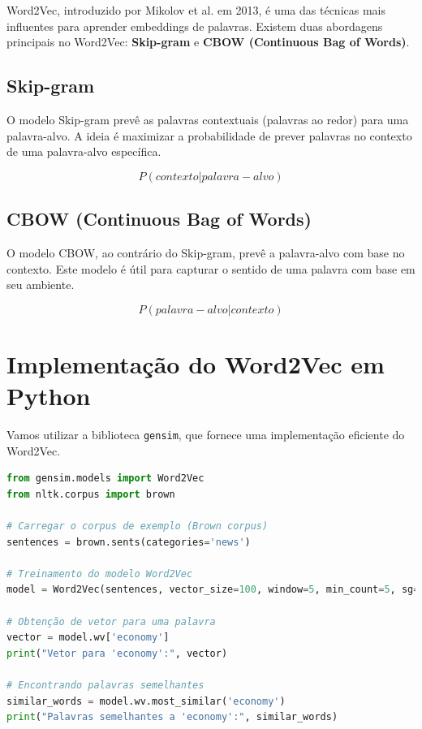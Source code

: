 \documentclass[14pt,a4paper,oneside]{book}
\begin{document}
Word2Vec, introduzido por Mikolov et al. em 2013, é uma das técnicas mais influentes para aprender embeddings de palavras. Existem duas abordagens principais no Word2Vec: \textbf{Skip-gram} e \textbf{CBOW (Continuous Bag of Words)}.

\subsection{Skip-gram}
O modelo Skip-gram prevê as palavras contextuais (palavras ao redor) para uma palavra-alvo. A ideia é maximizar a probabilidade de prever palavras no contexto de uma palavra-alvo específica.

\begin{equation}
	P(contexto | palavra-alvo)
\end{equation}

\subsection{CBOW (Continuous Bag of Words)}
O modelo CBOW, ao contrário do Skip-gram, prevê a palavra-alvo com base no contexto. Este modelo é útil para capturar o sentido de uma palavra com base em seu ambiente.

\begin{equation}
	P(palavra-alvo | contexto)
\end{equation}

\section{Implementação do Word2Vec em Python}

Vamos utilizar a biblioteca \texttt{gensim}, que fornece uma implementação eficiente do Word2Vec.

\begin{lstlisting}[language=Python]
from gensim.models import Word2Vec
from nltk.corpus import brown

# Carregar o corpus de exemplo (Brown corpus)
sentences = brown.sents(categories='news')

# Treinamento do modelo Word2Vec
model = Word2Vec(sentences, vector_size=100, window=5, min_count=5, sg=0)

# Obtenção de vetor para uma palavra
vector = model.wv['economy']
print("Vetor para 'economy':", vector)

# Encontrando palavras semelhantes
similar_words = model.wv.most_similar('economy')
print("Palavras semelhantes a 'economy':", similar_words)
\end{lstlisting}
\end{document}
